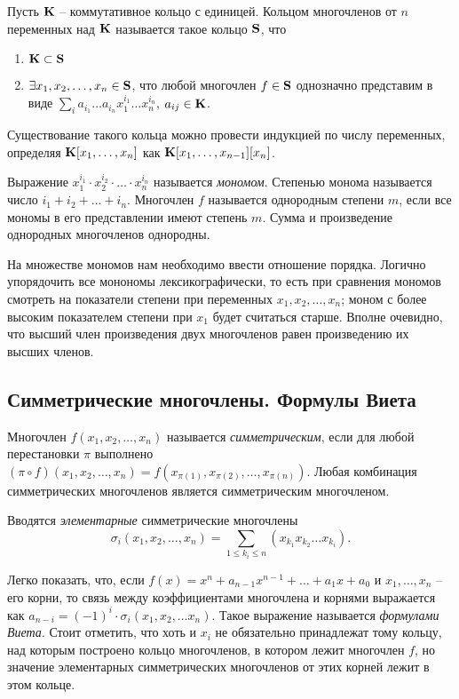 Пусть $\mathbf{K}$ -- коммутативное кольцо с единицей. Кольцом многочленов от $n$ переменных над $\mathbf{K}$ называется такое кольцо $\mathbf{S}$, что
\begin{enumerate}
  \item $\mathbf{K}\subset\mathbf{S}$
  \item $\exists x_1,x_2,\dots,x_n\in\mathbf{S}$, что любой многочлен $f\in\mathbf{S}$ однозначно представим в виде $\sum\limits_i a_{i_1}\dots a_{i_n}x_1^{i_1}\dots x_n^{i_n}$, $a_{ij}\in\mathbf{K}$.
\end{enumerate}

Существование такого кольца можно провести индукцией по числу переменных, определяя $\mathbf{K}[x_1,\dots,x_n]$ как $\mathbf{K}[x_1,\dots,x_{n-1}][x_n]$.

Выражение $x_1^{i_1}\cdot x_2^{i_2}\cdot\dots\cdot x_n^{i_n}$ называется \emph{мономом}. Степенью монома называется число $i_1+i_2+\dots+i_n$. Многочлен $f$ называется однородным степени $m$, если все мономы в его представлении имеют степень $m$. Сумма и произведение однородных многочленов однородны.

На множестве мономов нам необходимо ввести отношение порядка. Логично упорядочить все монономы лексикографически, то есть при сравнения мономов смотреть на показатели степени при переменных $x_1, x_2,\dots, x_n$; моном с более высоким показателем степени при $x_1$ будет считаться старше. Вполне очевидно, что высший член произведения двух многочленов равен произведению их высших членов.

\subsection{Симметрические многочлены. Формулы Виета}

\begin{df}
  Многочлен $f(x_1,x_2,\dots,x_n)$ называется \emph{симметрическим}, если для любой перестановки $\pi$ выполнено $(\pi\circ f)(x_1,x_2,\dots,x_n)=f(x_{\pi(1)},x_{\pi(2)},\dots,x_{\pi(n)})$. Любая комбинация симметрических многочленов является симметрическим многочленом.
  
  Вводятся \emph{элементарные} симметрические многочлены $$\sigma_i(x_1,x_2,\dots,x_n)=\sum\limits_{1\le k_i\le n}\left(x_{k_1}x_{k_2}\dots x_{k_i}\right).$$
\end{df}

Легко показать, что, если $f(x)=x^n+a_{n-1}x^{n-1}+\dots+a_1x+a_0$ и $x_1,\dots,x_n$ -- его корни, то связь между коэффициентами многочлена и корнями выражается как $a_{n-i}=(-1)^i\cdot \sigma_i(x_1,x_2,\dots x_n)$. Такое выражение называется \emph{формулами Виета}. Стоит отметить, что хоть и $x_i$ не обязательно принадлежат тому кольцу, над которым построено кольцо многочленов, в котором лежит многочлен $f$, но значение элементарных симметрических многочленов от этих корней лежит в этом кольце.\\

